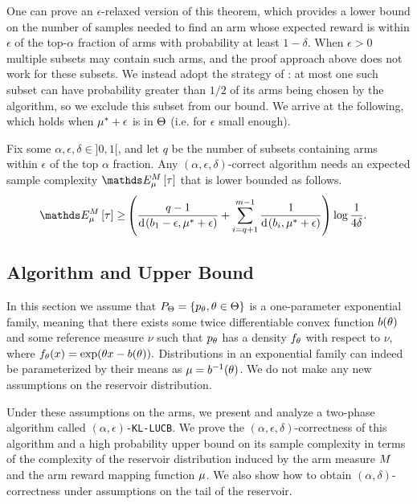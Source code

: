 One can prove an $\epsilon$-relaxed version of this
theorem, which provides a
lower bound on the number of samples needed to
find an arm whose expected reward is within $\epsilon$ of the top-$\alpha$ 
fraction of arms with probability at least $1-\delta$.
When $\epsilon>0$ multiple subsets may contain such arms, and the 
proof approach above does not work for these subsets.
We instead adopt the strategy of
\cite{Mannor04thesample}:
at most one such subset can have 
probability greater than $1/2$ of its arms being chosen by the algorithm,
so we exclude this subset from our bound.
We arrive at the following, which holds when $\mu^*+\epsilon$ is in $\Theta$ (i.e. for $\epsilon$ small enough).
%
\begin{remark}
Fix some $\alpha, \epsilon, \delta \in ]0,1[$,
and let $q$ be the number of subsets containing arms within $\epsilon$ of the top $\alpha$ fraction.
Any $(\alpha,\epsilon,\delta)$-correct algorithm needs an expected sample
complexity $\ETrueModel{\tau}$ that is lower bounded as follows.
%
\vspace{-5pt}
%
\begin{align*}
\ETrueModel{\tau} \ge & \left(
    \frac{q - 1}{\ArmKL{b_1-\epsilon}{\ArmMean^*+\epsilon}}
  + \sum_{i=q + 1}^{m-1} \frac{1}{
            \ArmKL{b_i}{\ArmMean^*+\epsilon}
     }
\right)
\log \frac{1}{4\delta}.
\end{align*}
\end{remark}

\subsection{Algorithm and Upper Bound}\label{sec-fc-upper}

In this section we assume that $P_{\ExpRewards} = \Set{ p_{\expReward}, \expReward \in \ExpRewards }$ is a one-parameter exponential family, meaning that there exists some twice differentiable convex function $b(\theta)$ and some reference measure $\nu$ such that $p_\theta$ has a density $f_\theta$ with respect to $\nu$, where 
$
f_\theta(x) = \exp(\theta x - b(\theta)).
$
Distributions in an exponential family can indeed be parameterized by their means as $\mu=b^{-1}(\theta)$.
We do not make any new assumptions on the reservoir distribution.

Under these assumptions on the arms, we present and analyze 
a two-phase algorithm called
\texttt{$(\alpha,\epsilon)$-KL-LUCB}.
We prove the $(\alpha,\epsilon,\delta)$-correctness of this algorithm and a high
probability upper bound on its sample complexity in terms of the complexity of
the reservoir distribution induced by the arm measure $M$ and the
arm reward mapping function $\mu$.
We also show how to
obtain $(\alpha,\delta)$-correctness
under assumptions on the tail of the reservoir.


